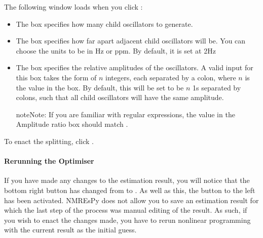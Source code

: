 \documentclass[letterpaper,10pt,english]{sphinxmanual}
\begin{document}
\sphinxAtStartPar
The following window loads when you click :

\begin{itemize}
\item {} 
\sphinxAtStartPar
The  box specifies how many child oscillators
to generate.

\item {} 
\sphinxAtStartPar
The  box specifies how far apart adjacent child
oscillators will be. You can choose the units to be in Hz or ppm. By
default, it is set at 2Hz

\item {} 
\sphinxAtStartPar
The  box specifies the relative amplitudes of the
oscillators. A valid input for this box takes the form of \(n\)
integers, each separated by a colon, where \(n\) is the value in
the  box. By default, this will be set to be
\(n\) 1s separated by colons, such that all child oscillators will
have the same amplitude.

\begin{sphinxadmonition}{note}{Note:}
\sphinxAtStartPar
If you are familiar with regular expressions, the value in the Amplitude
ratio box should match .
\end{sphinxadmonition}

\end{itemize}

\sphinxAtStartPar
To enact the splitting, click .


\paragraph{Re\sphinxhyphen{}running the Optimiser}
\label{\detokenize{gui/usage/result:re-running-the-optimiser}}
\sphinxAtStartPar
If you have made any changes to the estimation result, you will notice that
the bottom right button has changed from  to . As well
as this, the  button to the left has been activated. NMR\sphinxhyphen{}EsPy does
not allow you to save an estimation result for which the last step of the
process was manual editing of the result. As such, if you wish to enact the
changes made, you have to re\sphinxhyphen{}run nonlinear programming with the current result
as the initial guess.
\end{document}
